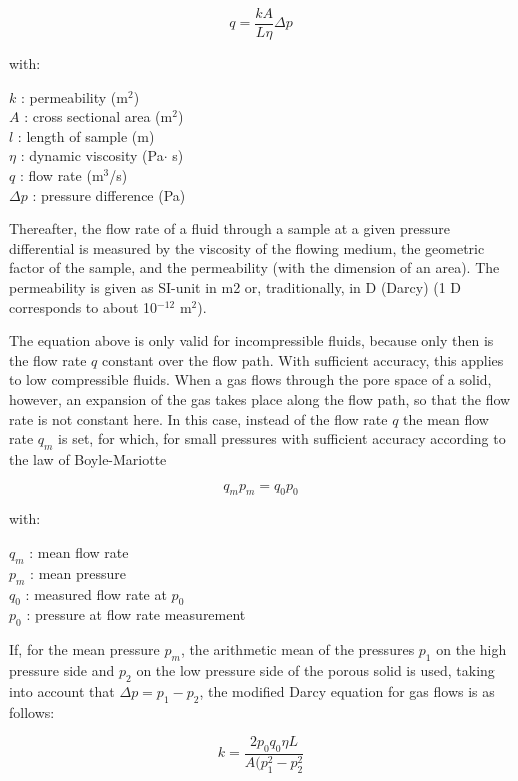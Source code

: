 \begin{equation}
q = \frac{kA}{L\eta}\Delta p
\end{equation}

with:

$k$ : permeability (m$^2$) \\
$A$ : cross sectional area (m$^2$) \\
$l$ : length of sample (m) \\
$\eta$ : dynamic viscosity (Pa$\cdot$ s) \\
$q$ : flow rate (m$^3$/s) \\
$\Delta p$ : pressure difference (Pa)

Thereafter, the flow rate of a fluid through a sample at a given pressure differential is measured by the viscosity of 
the flowing medium, the geometric factor of the sample, and the permeability (with the dimension of an area). The 
permeability is given as SI-unit in m2 or, traditionally, in D (Darcy) (1 D corresponds to about 10$^{-12}$ m$^2$).

The equation above is only valid for incompressible fluids, because only then is the flow rate $q$ constant over the flow path. 
With sufficient accuracy, this applies to low compressible fluids.
When a gas flows through the pore space of a solid, however, an expansion of the gas takes place along the flow path, so that the 
flow rate is not constant here. In this case, instead of the flow rate $q$ the mean flow rate $q_m$ is set, for which, for small 
pressures with sufficient accuracy according to the law of Boyle-Mariotte 

\begin{equation}
q_m p_m = q_0 p_0
\end{equation}

with:

$q_m$ : mean flow rate \\
$p_m$ : mean pressure \\
$q_0$ : measured flow rate at $p_0$ \\
$p_0$ : pressure at flow rate measurement 

If, for the mean pressure $p_m$, the arithmetic mean of the pressures $p_1$ on the high pressure side and $p_2$ on the low 
pressure side of the porous solid is used, taking into account that $\Delta p = p_1 - p_2$, the modified Darcy equation for 
gas flows is as follows:

\begin{equation}
k = \frac{2p_0q_0\eta L}{A(p_1^2-p_2^2}
\end{equation}

